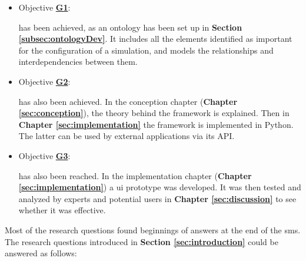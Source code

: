 \begin{itemize}
    \item Objective \hyperref[G1]{\textbf{G1}}:  
    
    has been achieved, as an ontology has been set up in \textbf{Section \ref{subsec:ontologyDev}}. It includes all the elements identified as important for the configuration of a simulation, and models the relationships and interdependencies between them.\\
    
    
    \item Objective \hyperref[G2]{\textbf{G2}}:
    
    has also been achieved. In the conception chapter (\textbf{Chapter \ref{sec:conception}}), the theory behind the framework is explained. Then in \textbf{Chapter \ref{sec:implementation}} the framework is implemented in Python. The latter can be used by external applications via its API.\\
    
    
    \item Objective \hyperref[G3]{\textbf{G3}}: 
    
    has also been reached. In the implementation chapter (\textbf{Chapter \ref{sec:implementation}}) a \acrshort{ui} prototype was developed. It was then tested and analyzed by experts and potential users in \textbf{Chapter \ref{sec:discussion}} to see whether it was effective.\\
\end{itemize}
    

Most of the research questions found beginnings of answers at the end of the  \acrfull{sms}. The research questions introduced in \textbf{Section \ref{sec:introduction}} could be answered as follows:

